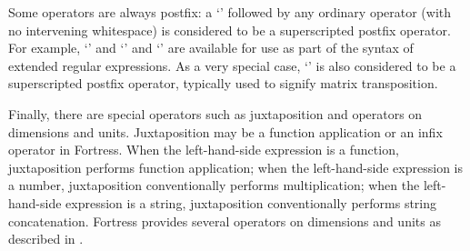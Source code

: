 Some operators are always postfix: a `' followed by
any ordinary operator (with no intervening whitespace) is considered to be a
superscripted postfix operator.  For example, `' and
`' and `'
are available for use as part
of the syntax of extended regular expressions.  As a very special case,
`' is also considered to be a superscripted
postfix operator,
typically used to signify matrix transposition.


Finally, there are special operators such as juxtaposition
and operators on dimensions and units.
Juxtaposition may be a function application or
an infix operator in Fortress.
When the left-hand-side expression is a function, juxtaposition performs
function application; when the left-hand-side expression is a number,
juxtaposition conventionally performs multiplication; when the
left-hand-side expression is a string,
juxtaposition conventionally performs string concatenation.
Fortress provides several operators on dimensions and units
as described in .
